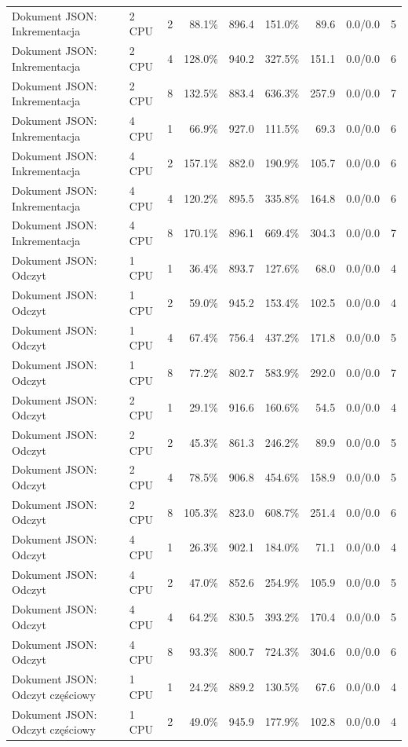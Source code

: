 \begin{table}[ht]
{\begin{tabular}{llcrrrrcc}
Dokument JSON: Inkrementacja & 2 CPU & 2 & 88.1\% & 896.4 & 151.0\% & 89.6 & 0.0/0.0 & 5 \\
Dokument JSON: Inkrementacja & 2 CPU & 4 & 128.0\% & 940.2 & 327.5\% & 151.1 & 0.0/0.0 & 6 \\
Dokument JSON: Inkrementacja & 2 CPU & 8 & 132.5\% & 883.4 & 636.3\% & 257.9 & 0.0/0.0 & 7 \\
Dokument JSON: Inkrementacja & 4 CPU & 1 & 66.9\% & 927.0 & 111.5\% & 69.3 & 0.0/0.0 & 6 \\
Dokument JSON: Inkrementacja & 4 CPU & 2 & 157.1\% & 882.0 & 190.9\% & 105.7 & 0.0/0.0 & 6 \\
Dokument JSON: Inkrementacja & 4 CPU & 4 & 120.2\% & 895.5 & 335.8\% & 164.8 & 0.0/0.0 & 6 \\
Dokument JSON: Inkrementacja & 4 CPU & 8 & 170.1\% & 896.1 & 669.4\% & 304.3 & 0.0/0.0 & 7 \\
Dokument JSON: Odczyt & 1 CPU & 1 & 36.4\% & 893.7 & 127.6\% & 68.0 & 0.0/0.0 & 4 \\
Dokument JSON: Odczyt & 1 CPU & 2 & 59.0\% & 945.2 & 153.4\% & 102.5 & 0.0/0.0 & 4 \\
Dokument JSON: Odczyt & 1 CPU & 4 & 67.4\% & 756.4 & 437.2\% & 171.8 & 0.0/0.0 & 5 \\
Dokument JSON: Odczyt & 1 CPU & 8 & 77.2\% & 802.7 & 583.9\% & 292.0 & 0.0/0.0 & 7 \\
Dokument JSON: Odczyt & 2 CPU & 1 & 29.1\% & 916.6 & 160.6\% & 54.5 & 0.0/0.0 & 4 \\
Dokument JSON: Odczyt & 2 CPU & 2 & 45.3\% & 861.3 & 246.2\% & 89.9 & 0.0/0.0 & 5 \\
Dokument JSON: Odczyt & 2 CPU & 4 & 78.5\% & 906.8 & 454.6\% & 158.9 & 0.0/0.0 & 5 \\
Dokument JSON: Odczyt & 2 CPU & 8 & 105.3\% & 823.0 & 608.7\% & 251.4 & 0.0/0.0 & 6 \\
Dokument JSON: Odczyt & 4 CPU & 1 & 26.3\% & 902.1 & 184.0\% & 71.1 & 0.0/0.0 & 4 \\
Dokument JSON: Odczyt & 4 CPU & 2 & 47.0\% & 852.6 & 254.9\% & 105.9 & 0.0/0.0 & 5 \\
Dokument JSON: Odczyt & 4 CPU & 4 & 64.2\% & 830.5 & 393.2\% & 170.4 & 0.0/0.0 & 5 \\
Dokument JSON: Odczyt & 4 CPU & 8 & 93.3\% & 800.7 & 724.3\% & 304.6 & 0.0/0.0 & 6 \\
Dokument JSON: Odczyt częściowy & 1 CPU & 1 & 24.2\% & 889.2 & 130.5\% & 67.6 & 0.0/0.0 & 4 \\
Dokument JSON: Odczyt częściowy & 1 CPU & 2 & 49.0\% & 945.9 & 177.9\% & 102.8 & 0.0/0.0 & 4 \\

\end{tabular}}
\end{table}
